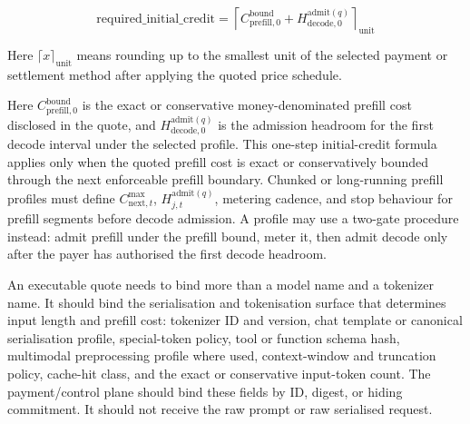 \documentclass[11pt]{article}
\begin{document}
\[
\mathrm{required\_initial\_credit} =
\left\lceil
C_{\mathrm{prefill},0}^{\mathrm{bound}} + H_{\mathrm{decode},0}^{\mathrm{admit}(q)}
\right\rceil_{\mathrm{unit}}
\]

Here \(\lceil x\rceil_{\mathrm{unit}}\) means rounding up to the smallest unit of the selected payment or settlement method after applying the quoted price schedule.

Here \(C_{\mathrm{prefill},0}^{\mathrm{bound}}\) is the exact or conservative money-denominated prefill cost disclosed in the quote, and \(H_{\mathrm{decode},0}^{\mathrm{admit}(q)}\) is the admission headroom for the first decode interval under the selected profile. This one-step initial-credit formula applies only when the quoted prefill cost is exact or conservatively bounded through the next enforceable prefill boundary. Chunked or long-running prefill profiles must define \(C_{\mathrm{next},t}^{\max}\), \(H_{j,t}^{\mathrm{admit}(q)}\), metering cadence, and stop behaviour for prefill segments before decode admission. A profile may use a two-gate procedure instead: admit prefill under the prefill bound, meter it, then admit decode only after the payer has authorised the first decode headroom.

An executable quote needs to bind more than a model name and a tokenizer name. It should bind the serialisation and tokenisation surface that determines input length and prefill cost: tokenizer ID and version, chat template or canonical serialisation profile, special-token policy, tool or function schema hash, multimodal preprocessing profile where used, context-window and truncation policy, cache-hit class, and the exact or conservative input-token count. The payment/control plane should bind these fields by ID, digest, or hiding commitment. It should not receive the raw prompt or raw serialised request.
\end{document}
